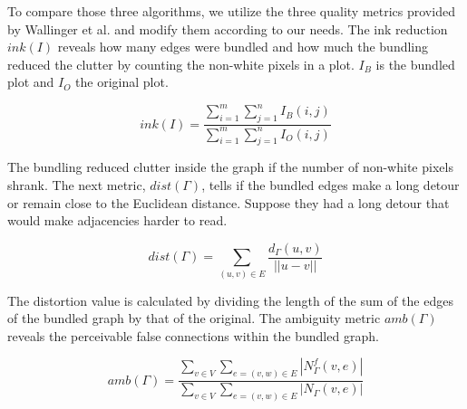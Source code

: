 To compare those three algorithms, we utilize the three quality metrics provided by Wallinger et al. \cite{wallinger_edge-path_2022} and modify them according to our needs. 
The ink reduction $ink(I)$ reveals how many edges were bundled and how much the bundling reduced the clutter by counting the non-white pixels in a plot. $I_B$ is the bundled plot and $I_O$ the original plot.

\begin{equation}
    ink(I)=\frac{\sum_{i=1}^m \sum_{j=1}^n I_B(i,j)}{\sum_{i=1}^m \sum_{j=1}^n I_O(i,j)}
\end{equation}

The bundling reduced clutter inside the graph if the number of non-white pixels shrank.
The next metric, $dist(\Gamma)$, tells if the bundled edges make a long detour or remain close to the Euclidean distance. Suppose they had a long detour that would make adjacencies harder to read. 

\begin{equation}
    dist(\Gamma)= \sum_{(u,v)\in E} \frac{d_{\Gamma}(u,v)}{||u-v||}
\end{equation}

The distortion value is calculated by dividing the length of the sum of the edges of the bundled graph by that of the original.
The ambiguity metric $amb(\Gamma)$ reveals the perceivable false connections within the bundled graph.

\begin{equation}
    amb(\Gamma)=\frac{\sum_{v \in V} \sum_{e=(v,w)\in E} |N_{\Gamma}^f(v,e)|}{\sum_{v \in V} \sum_{e=(v,w)\in E} |N_{\Gamma}(v,e)|}
\end{equation}

